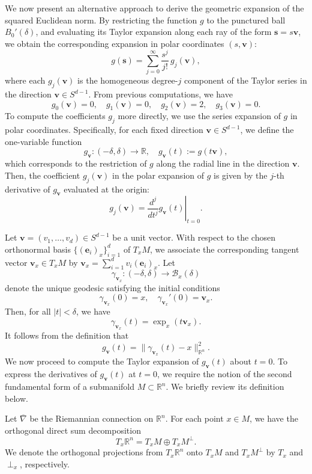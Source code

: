 \documentclass{amsart}
\theoremstyle{Theorem}
\theoremstyle{remark}
\numberwithin{equation}{section} \numberwithin{figure}{section}
\renewcommand*{\to}{\rightarrow}
\renewcommand*{\bar}[1]{\overline{#1}}
\begin{document}
We now present an alternative approach to derive the geometric expansion of the squared Euclidean norm. By restricting the function \( g \) to the punctured ball \( B_0'(\delta) \), and evaluating its Taylor expansion along each ray of the form \( \mathbf{s} = s \mathbf{v} \), we obtain the corresponding expansion in polar coordinates \( (s, \mathbf{v}) \):
\[
g(\mathbf{s}) = \sum_{j=0}^{\infty} \frac{s^j}{j!} \, g_j(\mathbf{v}),
\]
where each \( g_j(\mathbf{v}) \) is the homogeneous degree-\( j \) component of the Taylor series in the direction \( \mathbf{v} \in S^{d-1} \). From previous computations, we have
\[
g_0(\mathbf{v}) = 0, \quad g_1(\mathbf{v}) = 0, \quad g_2(\mathbf{v}) = 2, \quad g_3(\mathbf{v}) = 0.
\]
To compute the coefficients \( g_j \) more directly, we use the series expansion of \( g \) in polar coordinates. Specifically, for each fixed direction \( \mathbf{v} \in S^{d-1} \), we define the one-variable function
\[
g_{\mathbf{v}} : (-\delta, \delta) \to \mathbb{R}, \quad g_{\mathbf{v}}(t) := g(t \mathbf{v}),
\]
which corresponds to the restriction of \( g \) along the radial line in the direction \( \mathbf{v} \). Then, the coefficient \( g_j(\mathbf{v}) \) in the polar expansion of \( g \) is given by the \( j \)-th derivative of \( g_{\mathbf{v}} \) evaluated at the origin:
\[
g_j(\mathbf{v}) = \left. \frac{d^j}{dt^j} g_{\mathbf{v}}(t) \right|_{t = 0}.
\]


Let \( \mathbf{v} = (v_1, \dots, v_d) \in S^{d-1} \) be a unit vector. With respect to the chosen orthonormal basis \( \{ (\mathbf{e}_i)_x \}_{i=1}^d \) of \( T_x M \), we associate the corresponding tangent vector \( \mathbf{v}_x \in T_x M \) by
\(
\mathbf{v}_x = \sum_{i=1}^d v_i (\mathbf{e}_i)_x.
\)
Let
\[
\gamma_{\mathbf{v}_x} : (-\delta, \delta) \to \mathcal{B}_x(\delta)
\]
denote the unique geodesic satisfying the initial conditions
\[
\gamma_{\mathbf{v}_x}(0) = x, \quad \gamma_{\mathbf{v}_x}'(0) = \mathbf{v}_x.
\]
Then, for all \( |t| < \delta \), we have
\[
\gamma_{\mathbf{v}_x}(t) = \exp_x(t \mathbf{v}_x).
\] 
It follows from the definition that
\[
g_{\mathbf{v}}(t) = \| \gamma_{\mathbf{v}_{x}}(t) - x \|_{\mathbb{R}^n}^2.
\]
We now proceed to compute the Taylor expansion of \( g_{\mathbf{v}}(t) \) about \( t = 0 \). To express the derivatives of \( g_{\mathbf{v}}(t) \) at \( t = 0 \), we require the notion of the second fundamental form of a submanifold \( M \subset \mathbb{R}^n \). We briefly review its definition below.

Let \( \bar{\nabla} \) be the Riemannian connection on \( \mathbb{R}^n \). For each point \( x \in M \), we have the orthogonal direct sum decomposition
\[
T_x \mathbb{R}^n = T_x M \oplus T_x M^{\perp}.
\]
We denote the orthogonal projections from \( T_x \mathbb{R}^n \) onto \( T_x M \) and \( T_x M^{\perp} \) by \( T_x \) and \( \perp_x \), respectively.
\end{document}
